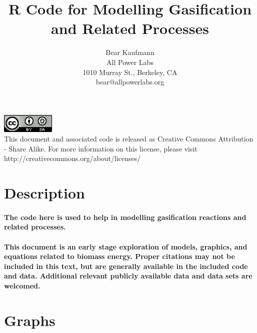 \documentclass[a4paper]{article}
\title{R Code for Modelling Gasification and Related Processes}
\author{Bear Kaufmann\\
\normalsize{All Power Labs}\\
\normalsize{1010 Murray St., Berkeley, CA}\\
\normalsize{bear@allpowerlabs.org}
}
\begin{document}
\maketitle
\vfill
\begin{center}
\includegraphics[width=1in]{documentation/images/cc_by_sa.png}\\
This document and associated code is released as Creative Commons Attribution - Share Alike.
For more information on this license, please visit http://creativecommons.org/about/licenses/
\end{center}
\newpage
\section{Description}
\paragraph{
	The code here is used to help in modelling gasification reactions and related processes.
}
\paragraph{
This document is an early stage exploration of models, graphics, and equations related to biomass energy. Proper citations may not be included in this text, but are generally available in the included code and data. Additional relevant publicly available data and data sets are welcomed.
}
\section{Graphs}
\end{document}

